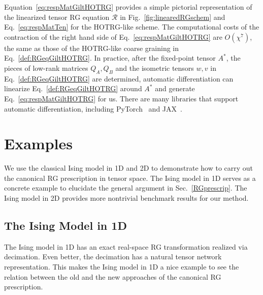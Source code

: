 \documentclass[aps,prr,reprint,superscriptaddress,nofootinbib,floatfix]{revtex4-2}
\begin{document}
Equation~\eqref{eq:respMatGiltHOTRG} provides a simple pictorial representation of the linearized tensor RG equation $\mathcal{R}$ in Fig.~\ref{fig:linearedRGschem} and Eq.~\eqref{eq:respMatTen} for the HOTRG-like scheme.
The computational costs of the contraction of the right hand side of Eq.~\eqref{eq:respMatGiltHOTRG} are $O(\chi^7)$, the same as those of the HOTRG-like coarse graining in Eq.~\eqref{def:RGeqGiltHOTRG}.
In practice, after the fixed-point tensor $A^*$, the pieces of low-rank matrices $Q_A,Q_B$ and the isometric tensors $w, v$ in Eq.~\eqref{def:RGeqGiltHOTRG} are determined, automatic differentiation can linearize Eq.~\eqref{def:RGeqGiltHOTRG} around $A^*$ and generate Eq.~\eqref{eq:respMatGiltHOTRG} for us.
There are many libraries that support automatic differentiation, including PyTorch~\cite{pytorch} and JAX~\cite{jax2018github}.
%

\section{Examples\label{benchmark}}
We use the classical Ising model in 1D and 2D to demonstrate how to carry out the canonical RG prescription in tensor space. 
The Ising model in 1D serves as a concrete example to elucidate the general argument in Sec.~\ref{RGprescrip}. 
The Ising model in 2D provides more nontrivial benchmark results for our method.
%

\subsection{The Ising Model in 1D\label{benchmark:1DIsing}}
The Ising model in 1D has an exact real-space RG transformation realized via decimation. 
Even better, the decimation has a natural tensor network representation. 
This makes the Ising model in 1D a nice example to see the relation between the old and the new approaches of the canonical RG prescription.
%
\end{document}
